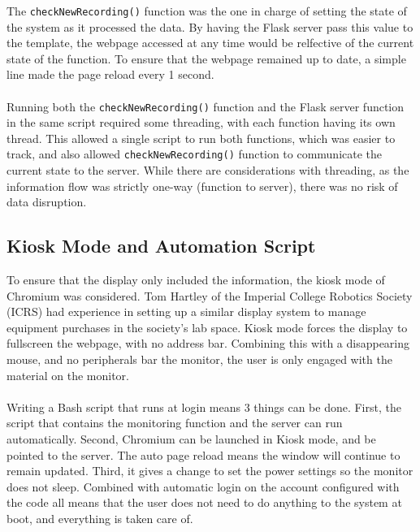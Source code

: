 \documentclass[main.tex]{subfiles}
\begin{document}
The \texttt{checkNewRecording()} function was the one in charge of setting the state of the system as it processed the data. By having the Flask server pass this value to the template, the webpage accessed at any time would be relfective of the current state of the function. To ensure that the webpage remained up to date, a simple line made the page reload every 1 second.
\\\\
Running both the \texttt{checkNewRecording()} function and the Flask server function in the same script required some threading, with each function having its own thread. This allowed a single script to run both functions, which was easier to track, and also allowed \texttt{checkNewRecording()} function to communicate the current state to the server. While there are considerations with threading, as the information flow was strictly one-way (function to server), there was no risk of data disruption.

\subsection{Kiosk Mode and Automation Script}
To ensure that the display only included the information, the kiosk mode of Chromium was considered. Tom Hartley of the Imperial College Robotics Society (ICRS) had experience in setting up a similar display system to manage equipment purchases in the society's lab space. Kiosk mode forces the display to fullscreen the webpage, with no address bar. Combining this with a disappearing mouse, and no peripherals bar the monitor, the user is only engaged with the material on the monitor.
\\\\
Writing a Bash script that runs at login means 3 things can be done. First, the script that contains the monitoring function and the server can run automatically. Second, Chromium can be launched in Kiosk mode, and be pointed to the server. The auto page reload means the window will continue to remain updated. Third, it gives a change to set the power settings so the monitor does not sleep. Combined with automatic login on the account configured with the code all means that the user does not need to do anything to the system at boot, and everything is taken care of.
\end{document}
